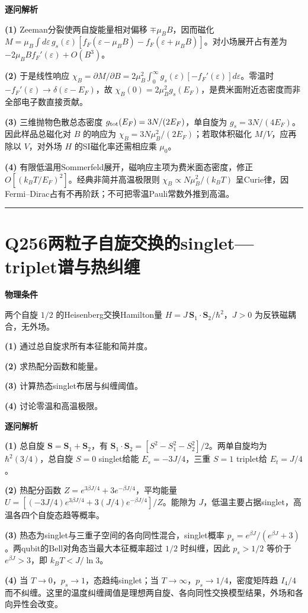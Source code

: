 \documentclass[UTF8,a4paper,11pt,oneside,openany]{ctexbook}
\begin{document}
\par\medskip\noindent\textbf{逐问解析}
\par\noindent\textbf{(1)} Zeeman分裂使两自旋能量相对偏移 \(\mp\mu_BB\)，因而磁化 \(M=\mu_B\int d\varepsilon\,g_s(\varepsilon)[f_F(\varepsilon-\mu_BB)-f_F(\varepsilon+\mu_BB)]\)。对小场展开占有差为 \(-2\mu_BB f_F'(\varepsilon)+O(B^3)\)。
\par\noindent\textbf{(2)} 于是线性响应 \(\chi_B=\partial M/\partial B=2\mu_B^2\int_0^\infty g_s(\varepsilon)[-f_F'(\varepsilon)]d\varepsilon\)。零温时 \(-f_F'(\varepsilon)\to\delta(\varepsilon-E_F)\)，故 \(\chi_B(0)=2\mu_B^2g_s(E_F)\)，是费米面附近态密度而非全部电子数直接贡献。
\par\noindent\textbf{(3)} 三维抛物色散总态密度 \(g_{\rm tot}(E_F)=3N/(2E_F)\)，单自旋为 \(g_s=3N/(4E_F)\)。因此样品总磁化对 \(B\) 的响应为 \(\chi_B=3N\mu_B^2/(2E_F)\)；若取体积磁化 \(M/V\)，应再除以 \(V\)，对外场 \(H\) 的SI磁化率还需相应乘 \(\mu_0\)。
\par\noindent\textbf{(4)} 有限低温用Sommerfeld展开，磁响应主项为费米面态密度，修正 \(O[(k_BT/E_F)^2]\)。经典非简并高温极限则 \(\chi_B\propto N\mu_B^2/(k_BT)\) 呈Curie律，因Fermi–Dirac占有不再阶跃；不可把零温Pauli常数外推到高温。

\par\bigskip\hrule\bigskip
\section*{Q256\quad 两粒子自旋交换的singlet—triplet谱与热纠缠}
\textbf{物理条件}\par 两个自旋 \(1/2\) 的Heisenberg交换Hamilton量 \(H=J\,\boldsymbol S_1\cdot\boldsymbol S_2/\hbar^2\)，\(J>0\) 为反铁磁耦合，无外场。
\par\noindent\textbf{(1)} 通过总自旋求所有本征能和简并度。
\par\noindent\textbf{(2)} 求热配分函数和能量。
\par\noindent\textbf{(3)} 计算热态singlet布居与纠缠阈值。
\par\noindent\textbf{(4)} 讨论零温和高温极限。

\par\medskip\noindent\textbf{逐问解析}
\par\noindent\textbf{(1)} 总自旋 \(\boldsymbol S=\boldsymbol S_1+\boldsymbol S_2\)，有 \(\boldsymbol S_1\cdot\boldsymbol S_2=[S^2-S_1^2-S_2^2]/2\)。两单自旋均为 \(\hbar^2(3/4)\)，总自旋 \(S=0\) singlet给能 \(E_s=-3J/4\)，三重 \(S=1\) triplet给 \(E_t=J/4\)。
\par\noindent\textbf{(2)} 热配分函数 \(Z=e^{3\beta J/4}+3e^{-\beta J/4}\)，平均能量 \(U=[(-3J/4)e^{3\beta J/4}+3(J/4)e^{-\beta J/4}]/Z\)。能隙为 \(J\)，低温主要占据singlet，高温各四个自旋态趋等概率。
\par\noindent\textbf{(3)} 热态为singlet与三重子空间的各向同性混合，singlet概率 \(p_s=e^{\beta J}/(e^{\beta J}+3)\)。两qubit的Bell对角态当最大本征概率超过 \(1/2\) 时纠缠，因此 \(p_s>1/2\) 等价于 \(e^{\beta J}>3\)，即 \(k_BT<J/\ln3\)。
\par\noindent\textbf{(4)} 当 \(T\to0\)，\(p_s\to1\)，态趋纯singlet；当 \(T\to\infty\)，\(p_s\to1/4\)，密度矩阵趋 \(I_4/4\) 而不纠缠。这里的温度纠缠阈值是理想两自旋、各向同性交换模型结果，外场和各向异性会改变。
\end{document}
